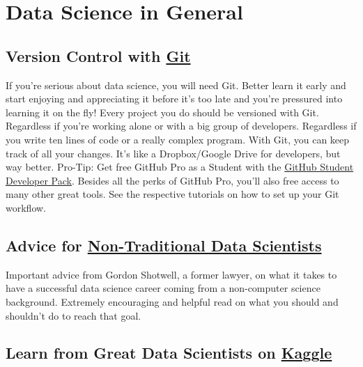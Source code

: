 \documentclass[
  11pt,
]{book}
\begin{document}
\hypertarget{data-science-in-general}{%
\section{Data Science in General}\label{data-science-in-general}}

\hypertarget{version-control-with-git}{%
\subsection*{\texorpdfstring{Version Control with
\href{https://github.com/}{Git}}{Version Control with Git}}\label{version-control-with-git}}

If you're serious about data science, you will need Git. Better learn it
early and start enjoying and appreciating it before it's too late and
you're pressured into learning it on the fly! Every project you do
should be versioned with Git. Regardless if you're working alone or with
a big group of developers. Regardless if you write ten lines of code or
a really complex program. With Git, you can keep track of all your
changes. It's like a Dropbox/Google Drive for developers, but way
better. Pro-Tip: Get free GitHub Pro as a Student with the
\href{https://education.github.com/pack}{GitHub Student Developer Pack}.
Besides all the perks of GitHub Pro, you'll also free access to many
other great tools. See the respective tutorials on how to set up your
Git workflow.

\hypertarget{advice-for-non-traditional-data-scientists}{%
\subsection*{\texorpdfstring{Advice for
\href{https://blog.shotwell.ca/posts/learning_data_science/}{Non-Traditional
Data
Scientists}}{Advice for Non-Traditional Data Scientists}}\label{advice-for-non-traditional-data-scientists}}

Important advice from Gordon Shotwell, a former lawyer, on what it takes
to have a successful data science career coming from a non-computer
science background. Extremely encouraging and helpful read on what you
should and shouldn't do to reach that goal.

\hypertarget{learn-from-great-data-scientists-on-kaggle}{%
\subsection*{\texorpdfstring{Learn from Great Data Scientists on
\href{https://www.kaggle.com/}{Kaggle}}{Learn from Great Data Scientists on Kaggle}}\label{learn-from-great-data-scientists-on-kaggle}}
\end{document}
